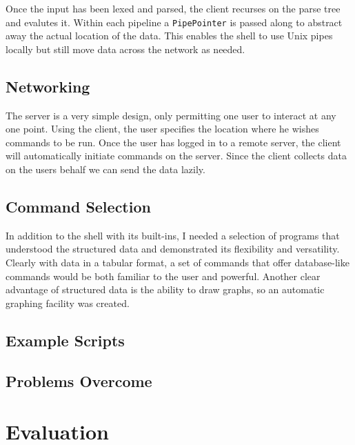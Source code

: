 \documentclass[12pt,twoside,notitlepage]{report}
\begin{document}
Once the input has been lexed and parsed, the client recurses on the parse tree
and evalutes it. Within each pipeline %
a {\tt PipePointer} is passed along to abstract away the actual location of the
data. This enables the shell to use Unix pipes locally %
but still move data across the network as needed.

\section{Networking}

The server is a very simple design, only permitting one user to interact at any
one point. Using the client, the user specifies the location where he wishes
commands to be run. Once the user has logged in to a remote server, the client
will automatically initiate commands on the server. Since the client collects
data on the users behalf we can send the data lazily.

\section{Command Selection}
In addition to the shell with its built-ins, I needed a selection of programs
that understood the structured data and demonstrated its flexibility and
versatility. Clearly with data in a tabular format, a set of commands that offer
database-like commands would be both familiar to the user and powerful. Another
clear advantage of structured data is the ability to draw graphs, so an
automatic graphing facility was created.

\section{Example Scripts}

\section{Problems Overcome}


\cleardoublepage

\chapter{Evaluation}
\end{document}
